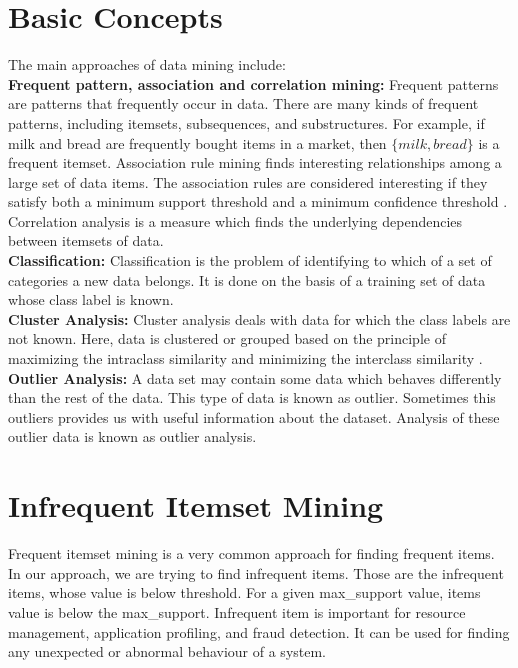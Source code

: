 %
%

\iffalse
\section{Basic Concepts}
The main approaches of data mining include:\\
\textbf{Frequent pattern, association and correlation mining:}
Frequent patterns are patterns that frequently occur in data. There are many kinds of frequent patterns, including itemsets, subsequences, and substructures. For example, if milk and bread are frequently bought items in a market, then $\{milk, bread\}$ is a frequent itemset. 
Association rule mining finds interesting relationships among a large set of data items. The association rules are considered interesting if they satisfy both a minimum support threshold and a minimum confidence threshold \cite{book}.
Correlation analysis is a measure which finds the underlying dependencies between itemsets of data.\\
%
\textbf{Classification:}
Classification is the problem of identifying to which of a set of categories a new data belongs. It is done on the basis of a training set of data whose class label is known.\\
%
\textbf{Cluster Analysis:}
Cluster analysis deals with data for which the class labels are not known. Here, data is clustered or grouped based on the principle of maximizing the intraclass similarity and minimizing the interclass similarity \cite{book}. \\
%
\textbf{Outlier Analysis:}
A data set may contain some data which behaves differently than the rest of the data. This type of data is known as outlier. Sometimes this outliers provides us with useful information about the dataset. Analysis of these outlier data is known as outlier analysis.  
%
\section{Infrequent Itemset Mining} \label{sec:graph_mining}
%
Frequent itemset mining is a very common approach for finding frequent items. In our approach, we are trying to find infrequent items. Those  are the infrequent items, whose value is below threshold. For a given max{\_}support value, items value is below the max{\_}support. Infrequent item is important for resource management, application profiling, and fraud detection. It can be used for finding any unexpected or abnormal behaviour of a system. 

